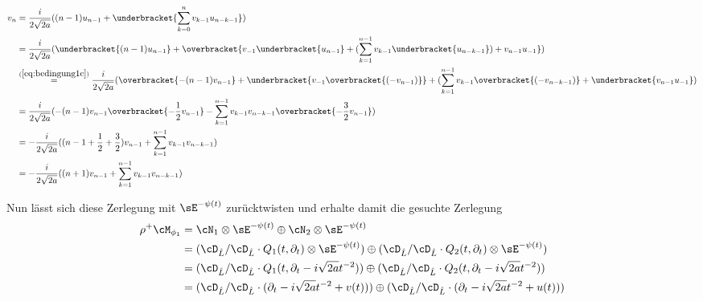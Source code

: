 \begin{align*}
v_{n} &= \frac{i}{2\sqrt{2a}}
  ((n-1)u_{n-1} + \underbracket{\sum_{k=0}^{n} v_{k-1}u_{n-k-1}})
\\&= \frac{i}{2\sqrt{2a}}
  (\underbracket{(n-1)u_{n-1}} + \overbracket{v_{-1}\underbracket{u_{n-1}}
  + (\sum_{k=1}^{n-1} v_{k-1}\underbracket{u_{n-k-1}}) + v_{n-1}u_{-1}})
\\&\overset{(\ref{eq:bedingung1c})}{=} \frac{i}{2\sqrt{2a}}
  (\overbracket{-(n-1)v_{n-1}} + \underbracket{v_{-1}\overbracket{(-v_{n-1})}}
  + (\sum_{k=1}^{n-1} v_{k-1}\overbracket{(-v_{n-k-1})} + \underbracket{v_{n-1}u_{-1}})
\\&= \frac{i}{2\sqrt{2a}} (-(n-1)v_{n-1} \overbracket{-\frac{1}{2}v_{n-1}}
  - \sum_{k=1}^{n-1} v_{k-1}v_{n-k-1} \overbracket{- \frac{3}{2} v_{n-1}})
\\&= - \frac{i}{2\sqrt{2a}} ((n-1+\frac{1}{2}+\frac{3}{2})v_{n-1}
  + \sum_{k=1}^{n-1} v_{k-1}v_{n-k-1})
\\&= - \frac{i}{2\sqrt{2a}} ((n+1)v_{n-1} + \sum_{k=1}^{n-1} v_{k-1}v_{n-k-1})
\end{align*}

\begin{comment}
$\cdots$
\end{comment}

Nun lässt sich diese Zerlegung mit $\sE^{-\psi(t)}$ zurücktwisten und erhalte
damit die gesuchte Zerlegung
\begin{align*}
\rho^+\cM_{\phi_1} &= \cN_1\otimes\sE^{-\psi(t)}\oplus\cN_2\otimes\sE^{-\psi(t)}
\\&= (\cD_{\hat L}/\cD_{\hat L}\cdot Q_1(t,\partial_t)\otimes\sE^{-\psi(t)})
  \oplus(\cD_{\hat L}/\cD_{\hat L}\cdot Q_2(t,\partial_t)\otimes\sE^{-\psi(t)})
\\&= (\cD_{\hat L}/\cD_{\hat L}\cdot Q_1(t,\partial_t-i\sqrt{2a}t^{-2}))
  \oplus(\cD_{\hat L}/\cD_{\hat L}\cdot Q_2(t,\partial_t-i\sqrt{2a}t^{-2}))
\\&= (\cD_{\hat L}/\cD_{\hat L}\cdot (\partial_t-i\sqrt{2a}t^{-2} + v(t)))
  \oplus(\cD_{\hat L}/\cD_{\hat L}\cdot (\partial_t-i\sqrt{2a}t^{-2} + u(t)))
\end{align*}

\begin{comment}
\subsection{Sabah's refined Levelt-Turrittin-Zerlegung für $\phi_1$}
\end{comment}

